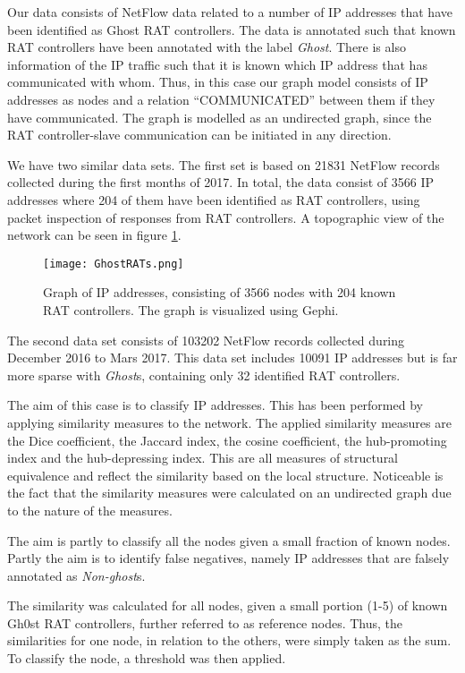 Our data consists of NetFlow data related to a number of IP addresses that have been identified as Ghost RAT controllers. The data is annotated such that known RAT controllers have been annotated with the label \textit{Ghost}. There is also information of the IP traffic such that it is known which IP address that has communicated with whom. Thus, in this case our graph model consists of IP addresses as nodes and a relation ``COMMUNICATED'' between them if they have communicated. The graph is modelled as an undirected graph, since the RAT controller-slave communication can be initiated in any direction.

We have two similar data sets. The first set is based on 21831 NetFlow records collected during the first months of 2017. In total, the data consist of 3566 IP addresses where 204 of them have been identified as RAT controllers, using packet inspection of responses from RAT controllers. A topographic view of the network can be seen in figure \ref{ip1}.

\begin{figure}[h!]
    \centering
    \texttt{[image: GhostRATs.png]}
    \caption{Graph of IP addresses, consisting of 3566 nodes with 204 known RAT controllers. The graph is visualized using Gephi.}
    \label{ip1}
\end{figure}

The second data set consists of 103202 NetFlow records collected during December 2016 to Mars 2017. This data set includes 10091 IP addresses but is far more sparse with \textit{Ghost}s, containing only 32 identified RAT controllers. 

The aim of this case is to classify IP addresses. This has been performed by applying similarity measures to the network. The applied similarity measures are the Dice coefficient, the Jaccard index, the cosine coefficient, the hub-promoting index and the hub-depressing index. This are all measures of structural equivalence and reflect the similarity based on the local structure. Noticeable is the fact that the similarity measures were calculated on an undirected graph due to the nature of the measures. 

The aim is partly to classify all the nodes given a small fraction of known nodes. Partly the aim is to identify false negatives, namely IP addresses that are falsely annotated as \textit{Non-ghost}s.

The similarity was calculated for all nodes, given a small portion (1-5) of known Gh0st RAT controllers, further referred to as reference nodes. Thus, the similarities for one node, in relation to the others, were simply taken as the sum. To classify the node, a threshold was then applied. 

